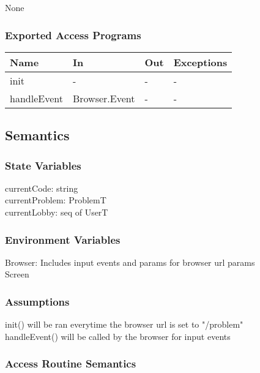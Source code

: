 \documentclass[12pt, titlepage]{article}
\begin{document}
None

\subsubsection{Exported Access Programs}

\begin{center}
\begin{tabular}{p{2cm} p{4cm} p{4cm} p{2cm}}
\hline
\textbf{Name} & \textbf{In} & \textbf{Out} & \textbf{Exceptions} \\
\hline
init & - & - & - \\
handleEvent & Browser.Event & - & -\\
\hline
\end{tabular}
\end{center}

\subsection{Semantics}

\subsubsection{State Variables}

currentCode: string \\
currentProblem: ProblemT \\
currentLobby: seq of UserT

\subsubsection{Environment Variables}

Browser: Includes input events and params for browser url params\\
Screen\\

\subsubsection{Assumptions}

init() will be ran everytime the browser url is set to "/problem"\\
handleEvent() will be called by the browser for input events

\subsubsection{Access Routine Semantics}
\end{document}

